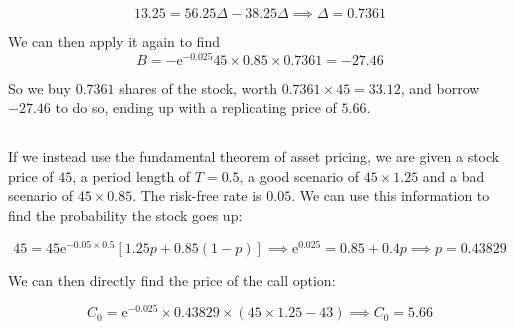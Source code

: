 \documentclass[12pt, letterpaper]{article}
\newcommand{\e}{\mathrm{e}}
\begin{document}
    \[ 13.25 = 56.25 \Delta - 38.25 \Delta \implies \Delta = 0.7361    \]

    We can then apply it again to find
    \[ B = - \e^{-0.025} 45 \times 0.85 \times 0.7361 =  -27.46   \]

    So we buy \(0.7361\) shares of the stock, worth \(0.7361 \times 45 = 33.12\), and borrow \(-27.46\) to do so, ending up with a replicating price of \(5.66\). 

    \subsection{}

    If we instead use the fundamental theorem of asset pricing, we are given a stock price of \(45\), a period length of \(T = 0.5\), a good scenario of \(45 \times 1.25\) and a bad scenario of \(45 \times 0.85\). The risk-free rate is \(0.05\). We can use this information to find the probability the stock goes up:

    \[  45 = 45 \e^{-0.05 \times 0.5} \left[ 1.25p + 0.85 (1 - p) \right] \implies \e^{0.025} = 0.85 + 0.4 p \implies p = 0.43829  \]

    We can then directly find the price of the call option:

    \[ C_0 = \e^{-0.025} \times 0.43829 \times \left( 45 \times 1.25 - 43 \right) \implies C_0 = 5.66  \]

    
\end{document}
